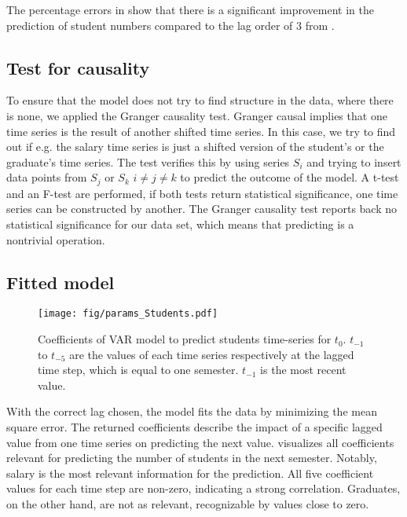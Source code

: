 \documentclass{article}
\theoremstyle{plain}
\theoremstyle{definition}
\theoremstyle{remark}
\begin{document}
The percentage errors in  show that there is a significant improvement in the prediction of student numbers
compared to the lag order of $3$ from .

\subsection{Test for causality}\label{sec:methods:causality}
To ensure that the model does not try to find structure in the data, where there is none, we applied the Granger causality test.
Granger causal implies that one time series is the result of another shifted time series.
In this case, we try to find out if e.g. the salary time series is just a shifted version of the student's or the graduate's time series.
The test verifies this by using series $S_i$ and trying to insert data points from $S_j$ or $S_k$ $i \neq j\neq k$
to predict the outcome of the model.
A t-test and an F-test are performed, if both tests return statistical significance, one time series can be constructed by another.
The Granger causality test reports back no statistical significance for our data set, which means that predicting is a nontrivial
operation.





\subsection{Fitted model}\label{sec:methods:fit}
\begin{figure}[t]
    \texttt{[image: fig/params\_Students.pdf]}
    \caption{Coefficients of VAR model to predict students time-series
    for $t_0$. $t_{-1}$ to $t_{-5}$ are the values of each time series respectively at the lagged time step, which is equal to one semester.
    $t_{-1}$ is the most recent value.}
    \label{fig:student coefficients}
\end{figure}

With the correct lag chosen, the model fits the data by minimizing the mean square error.
The returned coefficients describe the impact of a specific lagged value from one time series
on predicting the next value.  visualizes all coefficients
relevant for predicting the number of students in the next semester. 
Notably, salary is the most relevant information for the prediction. All five
coefficient values for each time step are non-zero, indicating a strong correlation.
Graduates, on the other hand, are not as relevant, recognizable by values close to zero.
\end{document}
